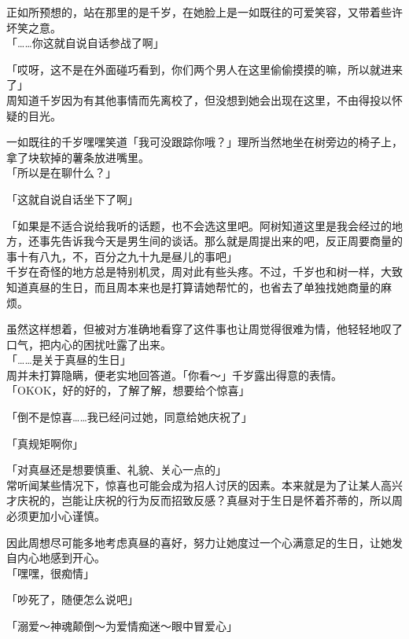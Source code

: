正如所预想的，站在那里的是千岁，在她脸上是一如既往的可爱笑容，又带着些许坏笑之意。\\

「……你这就自说自话参战了啊」

「哎呀，这不是在外面碰巧看到，你们两个男人在这里偷偷摸摸的嘛，所以就进来了」\\

周知道千岁因为有其他事情而先离校了，但没想到她会出现在这里，不由得投以怀疑的目光。

一如既往的千岁嘿嘿笑道「我可没跟踪你哦？」理所当然地坐在树旁边的椅子上，拿了块软掉的薯条放进嘴里。\\

「所以是在聊什么？」

「这就自说自话坐下了啊」

「如果是不适合说给我听的话题，也不会选这里吧。阿树知道这里是我会经过的地方，还事先告诉我今天是男生间的谈话。那么就是周提出来的吧，反正周要商量的事十有八九，不，百分之九十九是昼儿的事吧」\\

千岁在奇怪的地方总是特别机灵，周对此有些头疼。不过，千岁也和树一样，大致知道真昼的生日，而且周本来也是打算请她帮忙的，也省去了单独找她商量的麻烦。

虽然这样想着，但被对方准确地看穿了这件事也让周觉得很难为情，他轻轻地叹了口气，把内心的困扰吐露了出来。\\

「……是关于真昼的生日」\\

周并未打算隐瞒，便老实地回答道。「你看～」千岁露出得意的表情。\\

「OKOK，好的好的，了解了解，想要给个惊喜」

「倒不是惊喜……我已经问过她，同意给她庆祝了」

「真规矩啊你」

「对真昼还是想要慎重、礼貌、关心一点的」\\

常听闻某些情况下，惊喜也可能会成为招人讨厌的因素。本来就是为了让某人高兴才庆祝的，岂能让庆祝的行为反而招致反感？真昼对于生日是怀着芥蒂的，所以周必须更加小心谨慎。

因此周想尽可能多地考虑真昼的喜好，努力让她度过一个心满意足的生日，让她发自内心地感到开心。\\

「嘿嘿，很痴情」

「吵死了，随便怎么说吧」

「溺爱～神魂颠倒～为爱情痴迷～眼中冒爱心」


